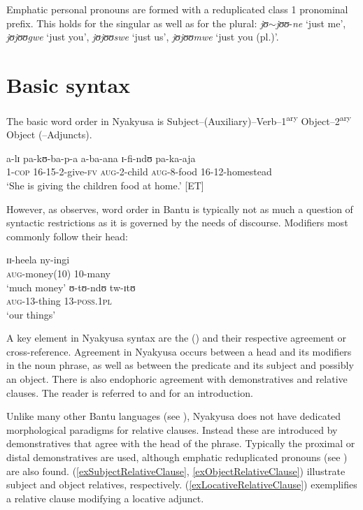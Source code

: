 \newpage
\noindent Emphatic personal pronouns are formed with a reduplicated class 1 pronominal prefix. This holds for the singular as well as for the plural: \textit{jʊ}$\sim$\textit{jʊʊ}-\textit{ne} `just me', \textit{jʊjʊʊgwe} `just you', \textit{jʊjʊʊswe} `just us', \textit{jʊjʊʊmwe} `just you (pl.)'. 

\section{Basic syntax}
The basic word order in Nyakyusa is Subject--(Auxiliary)--Verb--1\textsuperscript{ary} Object--2\textsuperscript{ary} Object (--Adjuncts).
\begin{exe}
	\ex \gll a-lɪ pa-kʊ-ba-p-a a-ba-ana ɪ-fi-ndʊ pa-ka-aja\\
	1-\textsc{cop} 16-15-2-give-\textsc{fv} \textsc{aug}-2-child \textsc{aug}-8-food 16-12-homestead\\
	\glt `She is giving the children food at home.' [ET]
\end{exe}  

However, as \citet{BearthT2003} observes, word order in Bantu is typically not as much a question of syntactic restrictions as it is governed by the needs of discourse. Modifiers most commonly follow their head:

\begin{exe}
	\ex \gll ɪɪ-heela ny-ingi\\
	\textsc{aug}-money(10) 10-many\\
	\glt `much money'
	\ex \gll ʊ-tʊ-ndʊ tw-ɪtʊ\\
	\textsc{aug}-13-thing 13-\textsc{poss.1pl}\\
	\glt `our things'
\end{exe}

A key element in Nyakyusa syntax are the  () and their respective agreement or cross-reference. Agreement in Nyakyusa occurs between a head and its modifiers in the noun phrase, as well as between the predicate and its subject and possibly an object. There is also endophoric agreement with demonstratives and relative clauses. The reader is referred to \citet{KatambaF2003} and \citet{BearthT2003} for an introduction.

\label{RelativeClausss} 
Unlike many other Bantu languages (see \citealt[ch. 3.3]{GueldemannT1996}), Nyakyusa does not have dedicated morphological paradigms for relative clauses. Instead these are introduced by demonstratives that agree with the head of the phrase. Typically the proximal or distal demonstratives are used, although emphatic reduplicated pronouns (see ) are also found. (\ref{exSubjectRelativeClause}, \ref{exObjectRelativeClause}) illustrate subject and object relatives, respectively. (\ref{exLocativeRelativeClause}) exemplifies a relative clause modifying a locative adjunct.

